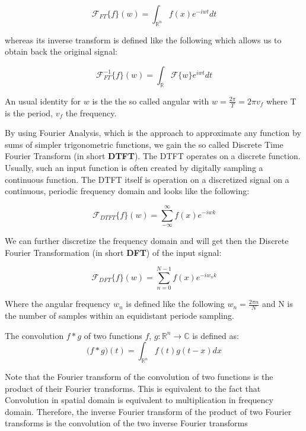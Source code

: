 \begin{equation}
  \mathcal{F}_{FT}\{f\}(w) = \int_{\mathds{R}^n} f(x)e^{-iwt} dt
\end{equation}

whereas its inverse transform is defined like the following which allows us to obtain back the original signal:

\begin{equation}
  \mathcal{F}_{FT}^{-1}\{f\}(w) = \int_{\mathds{R}} \mathcal{F}\{w\}e^{iwt} dt
\end{equation}

An usual identity for $w$ is the the so called angular with $w = \frac{2 \pi}{T} = 2 \pi v_f$ where T is the period, $v_f$ the frequency.

By using Fourier Analysis, which is the approach to approximate any function by sums of simpler trigonometric functions, we gain the so called Discrete Time Fourier Transform (in short \textbf{DTFT}). The DTFT operates on a discrete function. Usually, such an input function is often created by digitally sampling a continuous function. The DTFT itself is operation on a discretized signal on a continuous, periodic frequency domain and looks like the following:

\begin{equation}
  \mathcal{F}_{DTFT}\{f\}(w) = \sum_{-\infty}^{\infty} f(x) e^{-iwk}
\end{equation}

We can further discretize the frequency domain and will get then the Discrete Fourier Transformation (in short \textbf{DFT}) of the input signal:

\begin{equation}
  \mathcal{F}_{DFT}\{f\}(w) = \sum_{n=0}^{N-1} f(x) e^{-iw_{n}k}
\end{equation}

Where the angular frequency $w_n$ is defined like the following $w_n = \frac{2\pi n}{N}$ and N is the number of samples within an equidistant periode sampling.

The convolution $f*g$ of two functions $f$, $g$$\colon \mathds{R}^n \to \mathds{C} $ is defined as:  
\begin{equation}
  \mathcal (f*g)(t) = \int_{\mathds{R}^n} f(t)g(t-x) dx
\end{equation}

Note that the Fourier transform of the convolution of two functions is the product of their Fourier transforms. This is equivalent to the fact that Convolution in spatial domain is equivalent to multiplication in frequency domain. Therefore, the inverse Fourier transform of the product of two Fourier transforms is the convolution of the two inverse Fourier transforms

